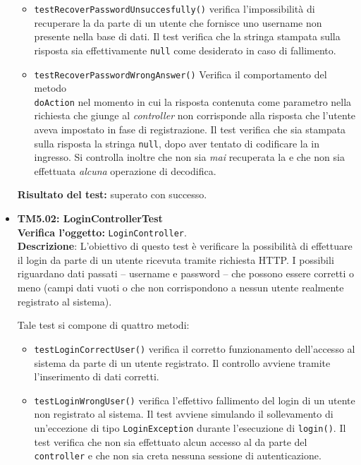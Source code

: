 \begin{itemize}
\begin{itemize}
\item \texttt{testRecoverPasswordUnsuccesfully()} verifica l'impossibilità di recuperare la  da parte di un utente che fornisce uno username non presente nella base di dati. Il test verifica che la stringa stampata sulla risposta sia effettivamente \texttt{null} come desiderato in caso di fallimento.

\item \texttt{testRecoverPasswordWrongAnswer()} Verifica il comportamento del metodo \\ \texttt{doAction} nel momento in cui la risposta contenuta come parametro nella richiesta che giunge al \textit{controller} non corrisponde alla risposta che l'utente aveva impostato in fase di registrazione. Il test verifica che sia stampata sulla risposta la stringa \texttt{null}, dopo aver tentato di codificare la  in ingresso. Si controlla inoltre che non sia \textit{mai} recuperata la  e che non sia effettuata \textit{alcuna} operazione di decodifica.

\end{itemize}

\textbf{Risultato del test:} superato con successo.


\item \textbf{TM5.02: LoginControllerTest}\\
\textbf{Verifica l'oggetto:} \texttt{LoginController}.\\
\textbf{Descrizione}: L'obiettivo di questo test è verificare la possibilità di effettuare il login da parte di un utente ricevuta tramite richiesta HTTP. I possibili  riguardano dati passati -- username e password -- che possono essere corretti o meno (campi dati vuoti o che non corrispondono a nessun utente realmente registrato al sistema).

Tale test si compone di quattro metodi:
\begin{itemize}

\item \texttt{testLoginCorrectUser()} verifica il corretto funzionamento dell'accesso al sistema da parte di un utente registrato. Il controllo avviene tramite l'inserimento di dati corretti.

\item \texttt{testLoginWrongUser()} verifica l'effettivo fallimento del login di un utente  non registrato al sistema. Il test avviene simulando il sollevamento di un'eccezione di tipo \texttt{LoginException} durante l'esecuzione di \texttt{login()}. Il test verifica che non sia effettuato alcun accesso al  da parte del \texttt{controller} e che non sia creta nessuna sessione di autenticazione.


\end{itemize}
\end{itemize}

